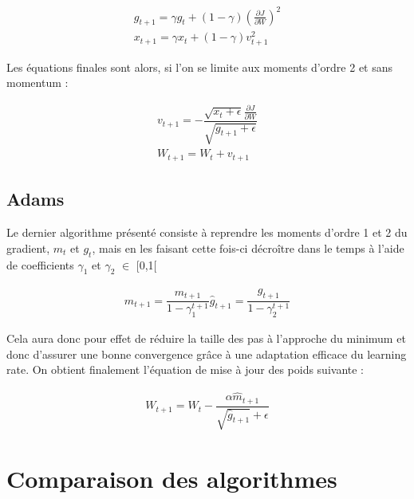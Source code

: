 \begin{equation} 
\begin{aligned}
g_{t+1} = \gamma g_t + (1-\gamma) (\frac{\partial J}{\partial W})^2 \\
x_{t+1} = \gamma x_t + (1-\gamma)v^2_{t+1}
\end{aligned}
\end{equation}


Les équations finales sont alors, si l'on se limite aux moments d'ordre 2 et sans momentum :

\begin{equation}
\begin{aligned}
v_{t+1} = - \dfrac{\sqrt{x_t + \epsilon}\frac{\partial J}{\partial W}}{\sqrt{g_{t+1}+\epsilon}}\\
W_{t+1} = W_t + v_{t+1}
\end{aligned}
\end{equation}
 
\subsection{Adams}

Le dernier algorithme présenté consiste à reprendre les moments d'ordre 1 et 2 du gradient, $m_t$ et $g_t$, mais en les faisant cette fois-ci décroître dans le temps à l'aide de coefficients $\gamma_1$ et $\gamma_2$ $\in$ [0,1[

\begin{equation}
\begin{aligned}
\hat{m}_{t+1}=\dfrac{m_{t+1}}{1-\gamma^{t+1}_1}
\hat{g}_{t+1}=\dfrac{g_{t+1}}{1-\gamma^{t+1}_2}
\end{aligned}
\end{equation}

Cela aura donc pour effet de réduire la taille des pas à l'approche du minimum et donc d'assurer une bonne convergence grâce à une adaptation efficace du learning rate. On obtient finalement l'équation de mise à jour des poids suivante :

\begin{equation}
\begin{aligned}
W_{t+1}=W_t - \dfrac{\alpha\hat{m}_{t+1}}{\sqrt{\hat{g}_{t+1}}+\epsilon}
\end{aligned}
\end{equation}

\section{Comparaison des algorithmes}

